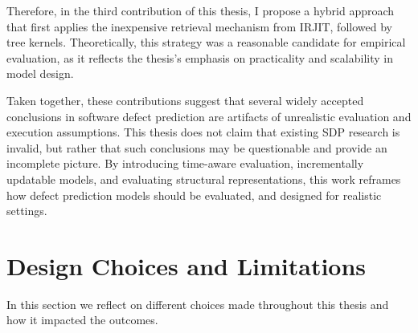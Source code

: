 \documentclass[\main/thesis.tex]{subfiles}
\begin{document}
Therefore, in the third contribution of this thesis, I propose a hybrid approach that first applies the inexpensive retrieval mechanism from IRJIT, followed by tree kernels. 
Theoretically, this strategy was a reasonable candidate for empirical evaluation, as it reflects the thesis's emphasis on practicality and scalability in model design. 

Taken together, these contributions suggest that several widely accepted conclusions in software defect prediction are artifacts of unrealistic evaluation and execution assumptions. This thesis does not claim that existing SDP research is invalid, but rather that such conclusions may be questionable and provide an incomplete picture. By introducing time-aware evaluation, incrementally updatable models, and evaluating structural representations, this work reframes how defect prediction models should be evaluated, and designed for realistic settings.





\section{Design Choices and Limitations}
In this section we reflect on different choices made throughout this thesis and how it impacted the outcomes.



\end{document}
